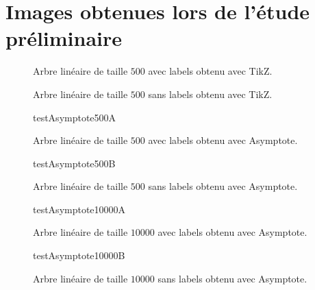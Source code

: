 \chapter{Images obtenues lors de l'étude préliminaire}

\begin{figure} \centering \resizebox {!}{10cm} {
}
\caption{Arbre linéaire de taille $500$ avec labels obtenu avec TikZ. \label{arbre500TikZA}}
\end{figure}


\begin{figure} \centering \resizebox {!}{10cm} {
}
\caption{Arbre linéaire de taille $500$ sans labels obtenu avec TikZ. \label{arbre500TikZB}}
\end{figure}


\begin{figure} \centering %
 {testAsymptote500A} %
\caption{Arbre linéaire de taille $500$ avec labels obtenu avec Asymptote. \label{arbre500AsyA}}
\end{figure}


\begin{figure} \centering %
 {testAsymptote500B} %
\caption{Arbre linéaire de taille $500$ sans labels obtenu avec Asymptote. \label{arbre500AsyB}}
\end{figure}


\begin{figure} \centering %
 {testAsymptote10000A}%
\caption{Arbre linéaire de taille $10000$ avec labels obtenu avec Asymptote. \label{arbre10000AsyA}}
\end{figure}


\begin{figure} \centering %
 {testAsymptote10000B}%
\caption{Arbre linéaire de taille $10000$ sans labels obtenu avec Asymptote. \label{arbre10000AsyB}}
\end{figure}

